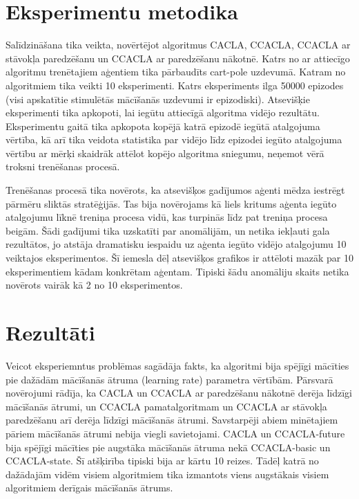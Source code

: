 \documentclass{ludis} %
\begin{document}
\section{Eksperimentu metodika}
Salīdzināšana tika veikta, novērtējot algoritmus CACLA, CCACLA, CCACLA ar
stāvokļa paredzēšanu un CCACLA ar paredzēšanu nākotnē. Katrs no ar attiecīgo
algoritmu trenētajiem aģentiem tika pārbaudīts cart-pole uzdevumā. Katram no
algoritmiem tika veikti 10 eksperimenti. Katrs eksperiments ilga 50000 epizodes
(visi apskatītie stimulētās mācīšanās uzdevumi ir epizodiski). Atsevišķie
eksperimenti tika apkopoti, lai iegūtu attiecīgā algoritma vidējo rezultātu.
Eksperimentu gaitā tika apkopota kopējā katrā epizodē iegūtā atalgojuma vērtība,
kā arī tika veidota statistika par vidējo līdz epizodei iegūto atalgojuma
vērtību ar mērķi skaidrāk attēlot kopējo algoritma sniegumu, neņemot vērā
troksni trenēšanas procesā.

Trenēšanas procesā tika novērots, ka atsevišķos gadījumos aģenti mēdza iestrēgt
pārmēru sliktās stratēģijās. Tas bija novērojams kā liels kritums aģenta iegūto
atalgojumu līknē treniņa procesa vidū, kas turpinās līdz pat treniņa procesa
beigām. Šādi gadījumi tika uzskatīti par anomālijām, un netika iekļauti gala
rezultātos, jo atstāja dramatisku iespaidu uz aģenta iegūto vidējo atalgojumu 10
veiktajos eksperimentos. Šī iemesla dēļ atsevišķos grafikos ir attēloti mazāk
par 10 eksperimentiem kādam konkrētam aģentam. Tipiski šādu anomāliju skaits
netika novērots vairāk kā 2 no 10 eksperimentos.


\section{Rezultāti}
Veicot eksperiemntus problēmas sagādāja fakts, ka algoritmi bija spējīgi
mācīties pie dažādām mācīšanās ātruma (learning rate) parametra vērtībām.
Pārsvarā novērojumi rādīja, ka CACLA un CCACLA ar paredzēšanu nākotnē derēja
līdzīgi mācīšanās ātrumi, un CCACLA pamatalgoritmam un CCACLA ar stāvokļa
paredzēšanu arī derēja līdzīgi mācīšanās ātrumi. Savstarpēji abiem minētajiem
pāriem mācīšanās ātrumi nebija viegli savietojami. CACLA un CCACLA-future bija
spējīgi mācīties pie augstāka mācīšanās ātruma nekā CCACLA-basic un
CCACLA-state. Šī atšķirība tipiski bija ar kārtu 10 reizes. Tādēļ katrā no
dažādajām vidēm visiem algoritmiem tika izmantots viens augstākais visiem
algoritmiem derīgais mācīšanās ātrums.
\end{document}
